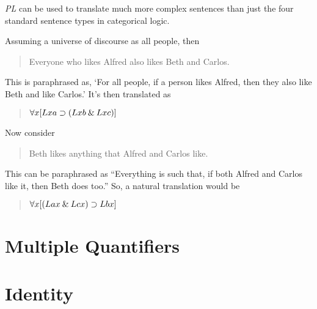 \documentclass[../logic-text.tex]{subfiles}
\begin{document}
\emph{PL} can be used to translate much more complex sentences than just the four standard sentence types in categorical logic.


Assuming a universe of discourse as all people, then

\begin{quote}
  Everyone who likes Alfred also likes Beth and Carlos.
\end{quote}

This is paraphrased as, \enquote*{For all people, if a person likes Alfred, then they also like Beth and like Carlos.}
It's then translated as 

\begin{quote}
  \(\forall x[Lxa \supset (Lxb \mathbin{\&} Lxc)]\)
\end{quote}

Now consider

\begin{quote}
  Beth likes anything that Alfred and Carlos like.
\end{quote}

This can be paraphrased as \enquote{Everything is such that, if both Alfred and Carlos like it, then Beth does too.}
So, a natural translation would be

\begin{quote}
  \(\forall x[(Lax \mathbin{\&} Lcx) \supset Lbx]\)
\end{quote}




\section{Multiple Quantifiers}
\label{sec:multiple-quantifiers}


\section{Identity}
\label{sec:identity}
\end{document}
